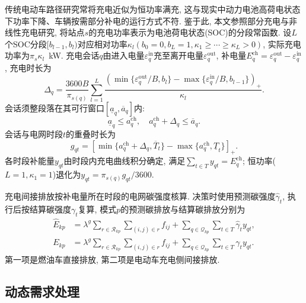 \documentclass{setp-new}
\begin{document}
传统电动车路径研究常将充电近似为恒功率满充,
这与现实中动力电池高荷电状态下功率下降、车辆按需部分补电的运行方式不符.
鉴于此, 本文参照部分充电与非线性充电研究\cite{ref:45,ref:46},
将站点$s$的充电功率表示为电池荷电状态(SOC)的分段常函数.
设$L$个SOC分段$[b_{l-1},b_l)$对应相对功率$\kappa_l(b_0=0,b_L=1,\kappa_1\ge\cdots\ge\kappa_L>0)$,
实际充电功率为$\pi_s\kappa_l$~kW.
充电会话$q$由进入电量$\varepsilon_q^{\mathrm{in}}$充至离开电量$\varepsilon_q^{\mathrm{out}}$,
补电量$E_q^{\mathrm{ch}}=\varepsilon_q^{\mathrm{out}}-\varepsilon_q^{\mathrm{in}}$,
充电时长为
\begin{equation}
\Delta_q=\frac{3600 B}{\pi_{s(q)}}\sum_{l=1}^{L}
\frac{(\min\{\varepsilon_q^{\mathrm{out}}/B,b_l\}
-\max\{\varepsilon_q^{\mathrm{in}}/B,b_{l-1}\})_+}{\kappa_l}.
\label{eq:charge_duration}
\end{equation}
会话须整段落在其可行窗口$[\underline a_q,\overline a_q]$内:
\begin{equation}
\underline a_q\le a_q^{\mathrm{ch}},\quad a_q^{\mathrm{ch}}+\Delta_q\le\overline a_q.
\label{eq:charge_window}
\end{equation}
会话与电网时段$t$的重叠时长为
\begin{equation}
g_{qt}=[\min\{a_q^{\mathrm{ch}}+\Delta_q,\overline T_t\}-\max\{a_q^{\mathrm{ch}},\underline T_t\}]_+ .
\label{eq:charge_overlap}
\end{equation}
各时段补能量$y_{qt}$由时段内充电曲线积分确定, 满足$\sum_{t\in T}y_{qt}=E_q^{\mathrm{ch}}$;
恒功率($L=1,\kappa_1=1$)退化为$y_{qt}=\pi_{s(q)}g_{qt}/3600$.

充电间接排放按补电量所在时段的电网碳强度核算.
决策时使用预测碳强度$\widehat\gamma_t$, 执行后按结算碳强度$\gamma_t$复算,
模式$p$的预测碳排放与结算碳排放分别为
\begin{equation}
\begin{aligned}
\widehat E_{kp}&=\lambda^g\sum_{r\in\mathcal R_{kp}}\sum_{(i,j)\in r}f_{ij}
+\sum_{q\in\mathcal Q_{kp}}\sum_{t\in T}\widehat\gamma_t y_{qt},\\
E_{kp}&=\lambda^g\sum_{r\in\mathcal R_{kp}}\sum_{(i,j)\in r}f_{ij}
+\sum_{q\in\mathcal Q_{kp}}\sum_{t\in T}\gamma_t y_{qt}.
\end{aligned}
\label{eq:carbon}
\end{equation}
第一项是燃油车直接排放, 第二项是电动车充电侧间接排放.

\subsection{动态需求处理}
\label{sec:dynamic-demand-model}
\end{document}

